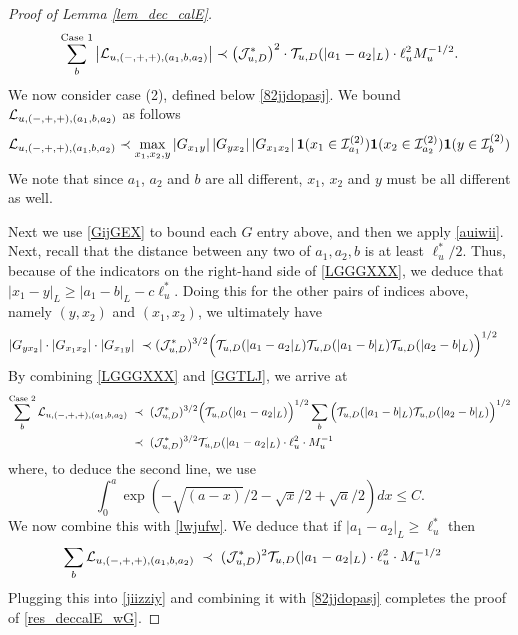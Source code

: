 \begin{proof}[Proof of Lemma \ref{lem_dec_calE}]
\begin{align}
    \label{lwjufw}
    \sum_{b } ^{\text{Case } 1} \left|{\cal L}_{u, (-,+,+),(a_1, b , a_2)}\right|\prec \left({\cal J}^*_{u,D}\right)^2\cdot{\cal T}_{u,D}(|a_1-a_2|_{L}) \cdot \ell_u^{2} M_{u}^{-1/2} .
\end{align}
We now consider case (2), defined below \eqref{82jjdopasj}. We bound  ${\cal L}_{u, (-,+,+),(a_1, b , a_2)}$ as follows
\begin{align}\label{LGGGXXX}
{\cal L}_{u, (-,+,+),(a_1, b , a_2)}
\prec \max_{x_1,x_2, y} \left|G_{x_1y}\right| \left|G_{yx_2}\right|\left|G_{x_1x_2}\right|{\bf 1}(x_1\in {\cal I}_{a_1}^{(2)}){\bf 1}(x_2\in {\cal I}_{a_2}^{(2)}){\bf 1}(y\in {\cal I}_{b}^{(2)})
\end{align}
We note that since $a_1$, $a_2$ and $b$ are all different,  $x_1$, $x_2$ and $y$ must be all different as well.
 
 
Next we use \eqref{GijGEX} to bound each $G$ entry above, and then we apply \eqref{auiwii}. Next, recall that the distance between any two of $a_{1},a_{2},b$ is at least $\ell^{*}_{u}/2$. Thus, because of the indicators on the right-hand side of \eqref{LGGGXXX}, we deduce that $|x_{1}-y|_{L}\geq |a_{1}-b|_{L}-c\ell_{u}^{\ast}$. Doing this for the other pairs of indices above, namely $(y,x_{2})$ and $(x_{1},x_{2})$, we ultimately have
 \begin{align}\label{GGTLJ}
 \left|G_{yx_2}\right|\cdot \left|G_{x_1x_2}\right| \cdot
\left|G_{x_1y}\right|
\;\prec \; & ({\cal J}_{u,D}^*)^{3/2} \Big( {\cal T}_{u,D}(|a_1-a_2|_{L}) {\cal T}_{u,D}(|a_1-b|_{L}){\cal T}_{u,D}(|a_2-b|_{L})\Big)^{1/2}
 \end{align}
By combining \eqref{LGGGXXX} and \eqref{GGTLJ}, we arrive at
\begin{align}
    \sum_{b}^{ \text {Case } 2 }{\cal L}_{u, (-,+,+),(a_1, b , a_2)} 
 \;\prec \;  &\; ({\cal J}_{u,D}^*)^{3/2} \Big( {\cal T}_{u,D}(|a_1-a_2|_{L})\Big)^{1/2} \sum_b \Big({\cal T}_{u,D}(|a_1-b|_{L}){\cal T}_{u,D}(|a_2-b|_{L})\Big)^{1/2}
 \nonumber \\
  \;\prec \; &\;({\cal J}_{u,D}^*)^{3/2}  {\cal T}_{u,D}(|a_1-a_2|_{L}) \cdot  \ell_u^{2}\cdot  M_{u}^{-1}
\end{align}
where, to deduce the second line, we use
$$
\int_{0 }^a\exp\left(-\sqrt{(a-x)}/2-\sqrt x/2+ \sqrt a/2\right)dx\le C .
$$
We now combine this with \eqref{lwjufw}. We deduce that if $|a_1-a_2|_{L}\ge \ell_u^*$ then
\begin{align}
    \sum_{b} {\cal L}_{u, (-,+,+),(a_1, b , a_2)} 
  \;\prec \; &\; ({\cal J}_{u,D}^*)^{2}  {\cal T}_{u,D}(|a_1-a_2|_{L}) \cdot  \ell_u^{2}\cdot  M_{u}^{-1/2}
\end{align}
Plugging this into \eqref{jiizziy} and combining it with  \eqref{82jjdopasj} completes the proof of  \eqref{res_deccalE_wG}.


\end{proof}
